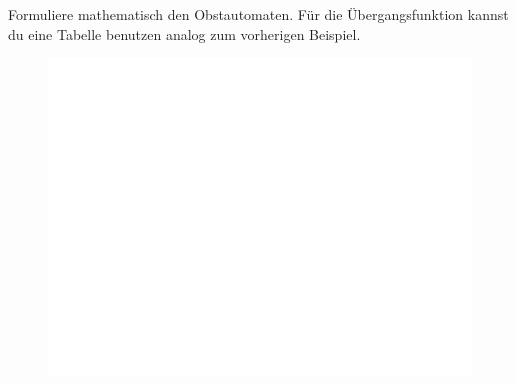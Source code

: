 %
%
Formuliere mathematisch den Obstautomaten. Für die Übergangsfunktion kannst du eine Tabelle benutzen analog zum vorherigen Beispiel.
\begin{figure}[H]
\centering
\includegraphics[width=\linewidth]{Pictures/weiss.png}
\end{figure}
